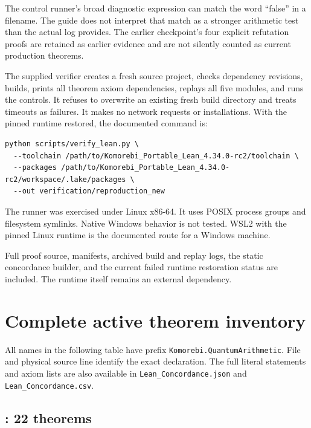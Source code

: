 The control runner's broad diagnostic expression can match the word ``false''
in a filename. The guide does not interpret that match as a stronger arithmetic
test than the actual log provides. The earlier checkpoint's four explicit
refutation proofs are retained as earlier evidence and are not silently counted
as current production theorems.

The supplied verifier creates a fresh source project, checks dependency revisions,
builds, prints all theorem axiom dependencies, replays all five modules, and runs
the controls. It refuses to overwrite an existing fresh build directory and
treats timeouts as failures. It makes no network requests or installations.
With the pinned runtime restored, the documented command is:

\begin{Verbatim}[breaklines=true,fontsize=\footnotesize]
python scripts/verify_lean.py \
  --toolchain /path/to/Komorebi_Portable_Lean_4.34.0-rc2/toolchain \
  --packages /path/to/Komorebi_Portable_Lean_4.34.0-rc2/workspace/.lake/packages \
  --out verification/reproduction_new
\end{Verbatim}
The runner was exercised under Linux x86-64. It uses POSIX process groups and
filesystem symlinks. Native Windows behavior is not tested. WSL2 with the pinned
Linux runtime is the documented route for a Windows machine.

Full proof source, manifests, archived build and replay logs, the static
concordance builder, and the current failed runtime restoration status are
included. The runtime itself remains an external dependency.

\section{Complete active theorem inventory}
All names in the following table have prefix
\texttt{Komorebi.QuantumArithmetic}. File and physical source line identify the
exact declaration. The full literal statements and axiom lists are also available
in \texttt{Lean\_Concordance.json} and \texttt{Lean\_Concordance.csv}.

\Needspace{10\baselineskip}
\subsection{\texttt{\detokenize{QuantumArithmeticBridge}}: 22 theorems}

